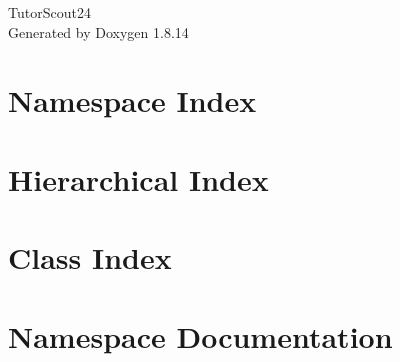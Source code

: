 \documentclass[twoside]{book}
\newcommand{\+}{\discretionary{\mbox{\scriptsize$\hookleftarrow$}}{}{}}
\newcommand{\clearemptydoublepage}{%
  \newpage{\pagestyle{empty}\cleardoublepage}%
}
\begin{document}
\hypersetup{pageanchor=false,
             bookmarksnumbered=true,
             pdfencoding=unicode
            }
\begin{titlepage}
\vspace*{7cm}
\begin{center}%
{\Large Tutor\+Scout24 }\\
\vspace*{1cm}
{\large Generated by Doxygen 1.8.14}\\
\end{center}
\end{titlepage}
\clearemptydoublepage
{}
\tableofcontents
\clearemptydoublepage
{}
\hypersetup{pageanchor=true}

\chapter{Namespace Index}

\chapter{Hierarchical Index}

\chapter{Class Index}

\chapter{Namespace Documentation}













\end{document}
